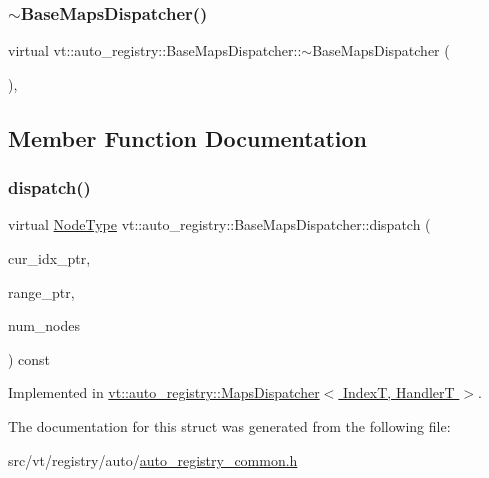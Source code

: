 \subsubsection{\texorpdfstring{$\sim$\+Base\+Maps\+Dispatcher()}{~BaseMapsDispatcher()}}
{\footnotesize\ttfamily virtual vt\+::auto\+\_\+registry\+::\+Base\+Maps\+Dispatcher\+::$\sim$\+Base\+Maps\+Dispatcher (\begin{DoxyParamCaption}{ }\end{DoxyParamCaption})\hspace{0.3cm}{\ttfamily [virtual]}, {\ttfamily [default]}}



\subsection{Member Function Documentation}
\mbox{\label{structvt_1_1auto__registry_1_1_base_maps_dispatcher_a36755202b288d1cb4eed6a57524b6398}} 
\subsubsection{\texorpdfstring{dispatch()}{dispatch()}}
{\footnotesize\ttfamily virtual \hyperlink{namespacevt_a866da9d0efc19c0a1ce79e9e492f47e2}{Node\+Type} vt\+::auto\+\_\+registry\+::\+Base\+Maps\+Dispatcher\+::dispatch (\begin{DoxyParamCaption}\item[{\hyperlink{structvt_1_1index_1_1_base_index}{index\+::\+Base\+Index} $\ast$}]{cur\+\_\+idx\+\_\+ptr,  }\item[{\hyperlink{structvt_1_1index_1_1_base_index}{index\+::\+Base\+Index} $\ast$}]{range\+\_\+ptr,  }\item[{\hyperlink{namespacevt_a866da9d0efc19c0a1ce79e9e492f47e2}{Node\+Type}}]{num\+\_\+nodes }\end{DoxyParamCaption}) const\hspace{0.3cm}{\ttfamily [pure virtual]}}



Implemented in \hyperlink{structvt_1_1auto__registry_1_1_maps_dispatcher_ac4fa2a94e5f3969bf09a7402c4469f0c}{vt\+::auto\+\_\+registry\+::\+Maps\+Dispatcher$<$ Index\+T, Handler\+T $>$}.



The documentation for this struct was generated from the following file\+:\begin{DoxyCompactItemize}
\item 
src/vt/registry/auto/\hyperlink{auto__registry__common_8h}{auto\+\_\+registry\+\_\+common.\+h}\end{DoxyCompactItemize}
